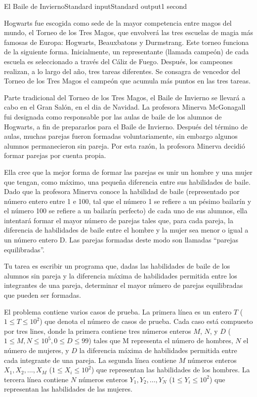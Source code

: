 \begin{problem}{El Baile de Invierno}{Standard input}{Standard output}{1 second}{}


Hogwarts fue escogida como sede de la mayor competencia entre magos del mundo, el Torneo de los Tres Magos, que envolverá las tres escuelas de magia más famosas de Europa: Hogwarts, Beauxbatons y Durmstrang. Este torneo funciona de la siguiente forma. Inicialmente, un representante (llamada campeón) de cada escuela es seleccionado a través del Cáliz de Fuego. Después, los campeones realizan, a lo largo del año, tres tareas diferentes. Se consagra de vencedor del Torneo de los Tres Magos el campeón  que acumula más puntos en las tres tareas.

Parte tradicional del Torneo de los Tres Magos, el Baile de Invierno se llevará a cabo en el Gran Salón, en el dia de Navidad. La profesora Minerva McGonagall fui designada como responsable por las aulas de baile de los alumnos de Hogwarts, a fin de prepararlos para el Baile de Invierno. Después del término de aulas, muchas parejas fueron formadas voluntariamente, sin embargo algunos alumnos permanecieron sin pareja. Por esta razón, la profesora Minerva decidió formar parejas por cuenta propia.

Ella cree que la mejor forma de formar las parejas es unir un hombre y una mujer que tengan, como máximo, una pequeña diferencia entre sus habilidades de baile. Dado que la profesora Minerva conoce la habilidad de baile (representado por número entero entre 1 e 100, tal que el número 1 se refiere a un pésimo bailarín y el número 100 se refiere a un bailarín perfecto) de cada uno de sus alumnos, ella intentará formar el mayor número de parejas tales que, para cada pareja, la diferencia de habilidades de baile entre el hombre y la mujer sea menor o igual a un número entero D. Las parejas formadas deste modo son llamadas “parejas equilibradas”.

Tu tarea es escribir un programa que, dadas las habilidades de baile de los alumnos sin pareja y la diferencia máxima de habilidades permitida entre los integrantes de una pareja, determinar el mayor número de parejas equilibradas que pueden ser formadas.

\InputFile
El problema contiene varios casos de prueba. La primera l\'inea es un entero $T$ ($1\leq T \leq 10^2$) que denota el número de casos de prueba. Cada caso está compuesto por tres lines, donde la primera contiene tres números enteros $M$, $N$, y $D$ ($1 \leq M, N \leq 10^5, 0 \leq D \leq 99$) tales que M representa el número de hombres, $N$ el número de mujeres, y $D$ la diferencia máxima de habilidades permitida entre cada integrante de una pareja. La segunda línea contiene $M$ números enteros $X_1, X_2, \dots, X_M$ ($1 \leq X_i \leq 10^2$) que representan las habilidades de los hombres. La tercera línea contiene $N$ números enteros $Y_1, Y_2, \dots, Y_N$ ($1 \leq Y_i \leq 10^2$) que representan las habilidades de las mujeres.


\end{problem}
